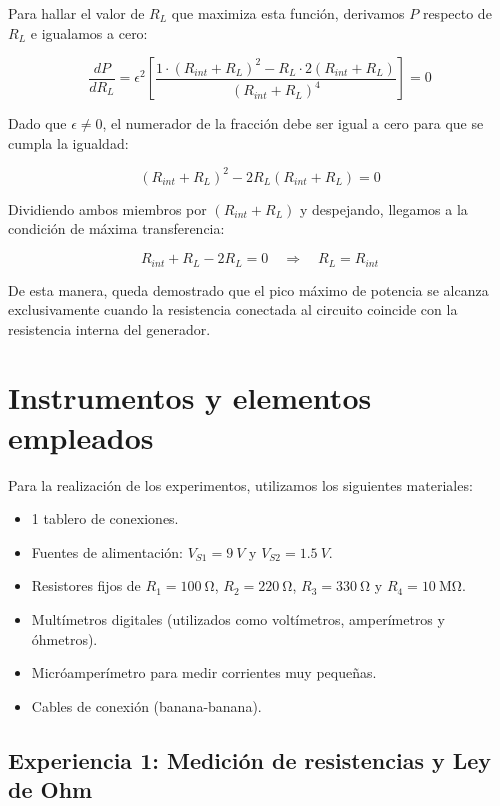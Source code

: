 \documentclass[11pt]{article}
\begin{document}
Para hallar el valor de $R_L$ que maximiza esta función, derivamos $P$ respecto de $R_L$ e igualamos a cero:

\begin{equation*}
\frac{dP}{dR_L} = \epsilon^2 \left[ \frac{1 \cdot (R_{int} + R_L)^2 - R_L \cdot 2(R_{int} + R_L)}{(R_{int} + R_L)^4} \right] = 0
\end{equation*}

Dado que $\epsilon \neq 0$, el numerador de la fracción debe ser igual a cero para que se cumpla la igualdad:

\begin{equation*}
(R_{int} + R_L)^2 - 2R_L(R_{int} + R_L) = 0
\end{equation*}

Dividiendo ambos miembros por $(R_{int} + R_L)$ y despejando, llegamos a la condición de máxima transferencia:

\begin{equation}
R_{int} + R_L - 2R_L = 0 \quad \Longrightarrow \quad R_L = R_{int}
\label{eq:max_potencia}
\end{equation}

De esta manera, queda demostrado que el pico máximo de potencia se alcanza exclusivamente cuando la resistencia conectada al circuito coincide con la resistencia interna del generador.
\section{Instrumentos y elementos empleados}
Para la realización de los experimentos, utilizamos los siguientes materiales:
\begin{itemize}
    \item 1 tablero de conexiones.
    \item Fuentes de alimentación: $V_{S1} = \SI{9}{V}$ y $V_{S2} = \SI{1.5}{V}$.
    \item Resistores fijos de $R_{1} = \SI{100}{\ohm}$, $R_{2} = \SI{220}{\ohm}$, $R_{3} = \SI{330}{\ohm}$ y $R_{4} = \SI{10}{\mega\ohm}$.
    \item Multímetros digitales (utilizados como voltímetros, amperímetros y óhmetros).
    \item Micróamperímetro para medir corrientes muy pequeñas.
    \item Cables de conexión (banana-banana).
\end{itemize}

\subsection*{Experiencia 1: Medición de resistencias y Ley de Ohm}
\end{document}
